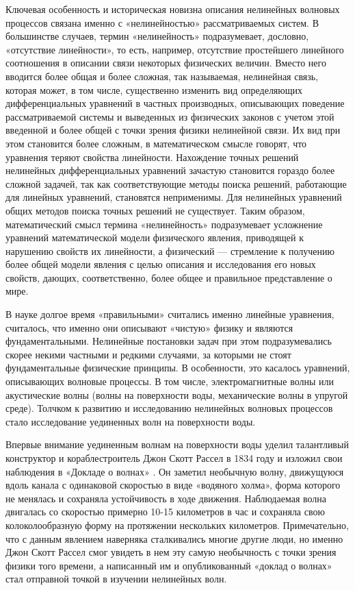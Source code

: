 Ключевая особенность и историческая новизна описания нелинейных волновых процессов связана именно с «нелинейностью» рассматриваемых систем. В большинстве случаев, термин «нелинейность» подразумевает, дословно, «отсутствие линейности», то есть, например, отсутствие простейшего линейного соотношения в описании связи некоторых физических величин. Вместо него вводится более общая и более сложная, так называемая, нелинейная связь, которая может, в том числе, существенно изменить вид определяющих дифференциальных уравнений в частных производных, описывающих поведение рассматриваемой системы и выведенных из физических законов с учетом этой введенной и более общей с точки зрения физики нелинейной связи. Их вид при этом становится более сложным, в математическом смысле говорят, что уравнения теряют свойства линейности. Нахождение точных решений нелинейных дифференциальных уравнений зачастую становится гораздо более сложной задачей, так как соответствующие методы поиска решений, работающие для линейных уравнений, становятся неприменимы. Для нелинейных уравнений общих методов поиска точных решений не существует. Таким образом, математический смысл термина «нелинейность» подразумевает усложнение уравнений математической модели физического явления, приводящей к нарушению свойств их линейности, а физический --- стремление к получению более общей модели явления с целью описания и исследования его новых свойств, дающих, соответственно, более общее и правильное представление о мире.

В науке долгое время «правильными» считались именно линейные уравнения, считалось, что именно они описывают «чистую» физику и являются фундаментальными. Нелинейные постановки задач при этом подразумевались скорее некими частными и редкими случаями, за которыми не стоят фундаментальные физические принципы. В особенности, это касалось уравнений, описывающих волновые процессы. В том числе, электромагнитные волны или акустические волны (волны на поверхности воды, механические волны в упругой среде). Толчком к развитию и исследованию нелинейных волновых процессов стало исследование уединенных волн на поверхности воды.

Впервые внимание уединенным волнам на поверхности воды уделил талантливый конструктор и кораблестроитель Джон Скотт Рассел в 1834 году и изложил свои наблюдения в «Докладе о волнах» \cite{russell1845report}. Он заметил необычную волну, движущуюся вдоль канала с одинаковой скоростью в виде «водяного холма», форма которого не менялась и сохраняла устойчивость в ходе движения. Наблюдаемая волна двигалась со скоростью примерно 10-15 километров в час и сохраняла свою колоколообразную форму на протяжении нескольких километров. Примечательно, что с данным явлением наверняка сталкивались многие другие люди, но именно Джон Скотт Рассел смог увидеть в нем эту самую необычность с точки зрения физики того времени, а написанный им и опубликованный «доклад о волнах» стал отправной точкой в изучении нелинейных волн. 

